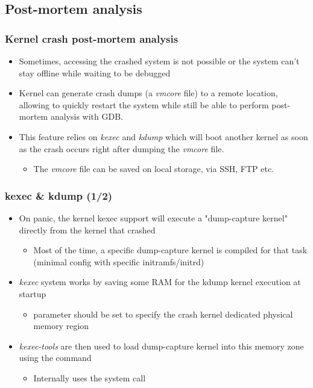\subsection{Post-mortem analysis}

\begin{frame}
  \frametitle{Kernel crash post-mortem analysis}
  \begin{itemize}
    \item Sometimes, accessing the crashed system is not possible or the system
          can't stay offline while waiting to be debugged
    \item Kernel can generate crash dumps (a {\em vmcore} file) to a remote
          location, allowing to quickly restart the system while still
          be able to perform post-mortem analysis with GDB.
    \item This feature relies on {\em kexec} and {\em kdump} which will
          boot another kernel as soon as the crash occurs right after dumping the
          {\em vmcore} file.
    \begin{itemize}
      \item The {\em vmcore} file can be saved on local storage, via SSH, FTP etc.
    \end{itemize}
  \end{itemize}
\end{frame}

\begin{frame}[fragile]
  \frametitle{kexec \& kdump (1/2)}
  \begin{itemize}
    \item On panic, the kernel kexec support will execute a "dump-capture
      kernel" directly from the kernel that crashed
    \begin{itemize}
      \item Most of the time, a specific dump-capture kernel is compiled
        for that task (minimal config with specific initramfs/initrd)
    \end{itemize}
    \item {\em kexec} system works by saving some RAM for the kdump kernel
      execution at startup
    \begin{itemize}
      \item {} parameter should be set to specify the crash
            kernel dedicated physical memory region
    \end{itemize}
    \item {\em kexec-tools} are then used to load dump-capture kernel into
      this memory zone using the  command
    \begin{itemize}
      \item Internally uses the  system call
    \end{itemize}
  \end{itemize}
\end{frame}

